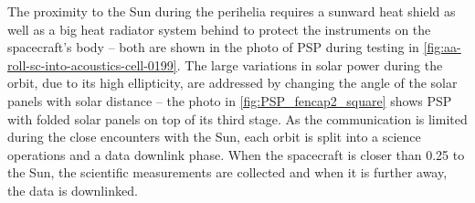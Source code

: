 The proximity to the Sun during the perihelia requires a sunward heat shield as well as a big heat radiator system behind to protect the instruments on the spacecraft's body -- both are shown in the photo of PSP during testing in \autoref{fig:aa-roll-sc-into-acoustics-cell-0199}. The large variations in solar power during the orbit, due to its high ellipticity, are addressed by changing the angle of the solar panels with solar distance -- the photo in \autoref{fig:PSP_fencap2_square} shows PSP with folded solar panels on top of its third stage. As the communication is limited during the close encounters with the Sun, each orbit is split into a science operations and a data downlink phase. When the spacecraft is closer than \SI{0.25}{\au} to the Sun, the scientific measurements are collected and when it is further away, the data is downlinked.
\begin{figure}[htb]
	\begin{floatrow}
\end{floatrow}
\end{figure}
